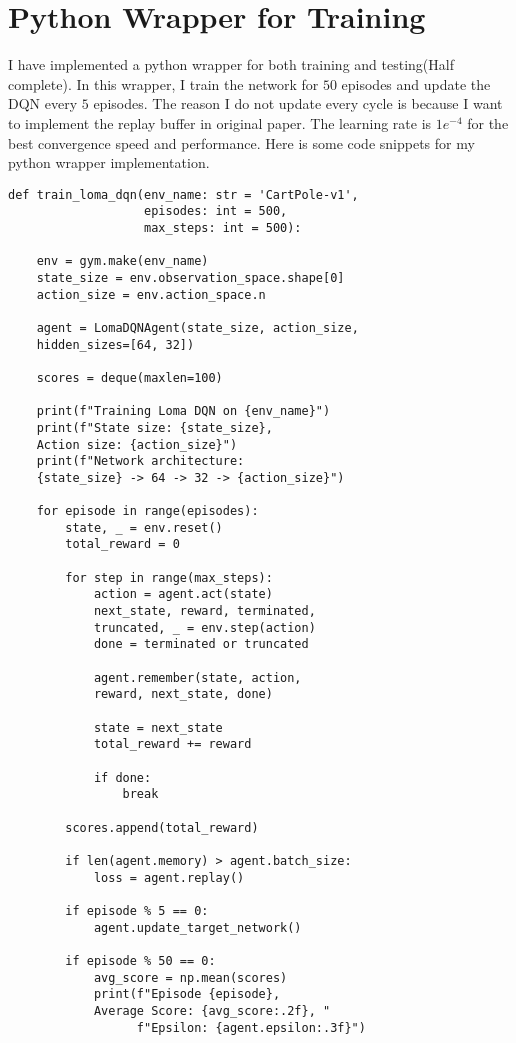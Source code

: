 \documentclass{article}
\begin{document}
\section{Python Wrapper for Training}
I have implemented a python wrapper for both training and testing(Half complete). In this wrapper, I train the network for $50$ episodes and update the DQN every $5$ episodes.
The reason I do not update every cycle is because I want to implement the replay buffer in original paper. The learning rate is $1e^{-4}$ for the best convergence speed and performance.
Here is some code snippets for my python wrapper implementation.
\begin{lstlisting}
def train_loma_dqn(env_name: str = 'CartPole-v1', 
                   episodes: int = 500,
                   max_steps: int = 500):
    
    env = gym.make(env_name)
    state_size = env.observation_space.shape[0]
    action_size = env.action_space.n
    
    agent = LomaDQNAgent(state_size, action_size, 
    hidden_sizes=[64, 32])
    
    scores = deque(maxlen=100)
    
    print(f"Training Loma DQN on {env_name}")
    print(f"State size: {state_size}, 
    Action size: {action_size}")
    print(f"Network architecture: 
    {state_size} -> 64 -> 32 -> {action_size}")
    
    for episode in range(episodes):
        state, _ = env.reset()
        total_reward = 0
        
        for step in range(max_steps):
            action = agent.act(state)
            next_state, reward, terminated, 
            truncated, _ = env.step(action)
            done = terminated or truncated
            
            agent.remember(state, action, 
            reward, next_state, done)
            
            state = next_state
            total_reward += reward
            
            if done:
                break
        
        scores.append(total_reward)
        
        if len(agent.memory) > agent.batch_size:
            loss = agent.replay()
        
        if episode % 5 == 0:
            agent.update_target_network()
        
        if episode % 50 == 0:
            avg_score = np.mean(scores)
            print(f"Episode {episode}, 
            Average Score: {avg_score:.2f}, "
                  f"Epsilon: {agent.epsilon:.3f}")
\end{lstlisting}
\end{document}
